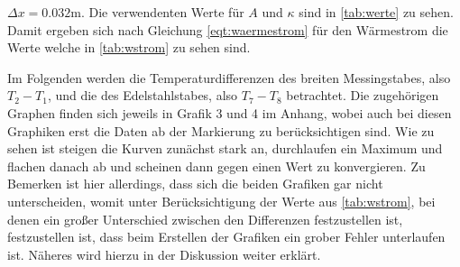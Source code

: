 $\Delta x = 0.032$m. 
Die verwendenten Werte für $A$ und $\kappa$ sind in \autoref{tab:werte} zu sehen.
Damit ergeben sich nach Gleichung \eqref{eqt:waermestrom} für den Wärmestrom die Werte welche in \autoref{tab:wstrom} zu sehen sind.



Im Folgenden werden die Temperaturdifferenzen des breiten Messingstabes, also $T_2-T_1$, und die des Edelstahlstabes, also $T_7 - T_8$ betrachtet. Die 
zugehörigen Graphen finden sich jeweils in Grafik 3 und 4 im Anhang, wobei auch bei diesen Graphiken erst die Daten ab der Markierung zu berücksichtigen sind.
Wie zu sehen ist steigen die Kurven zunächst stark an, durchlaufen ein Maximum und flachen danach ab und scheinen dann gegen einen Wert zu konvergieren.
Zu Bemerken ist hier allerdings, dass sich die beiden Grafiken gar nicht unterscheiden, womit unter Berücksichtigung der Werte aus \autoref{tab:wstrom}, bei denen 
ein großer Unterschied zwischen den Differenzen festzustellen ist, festzustellen ist, dass beim Erstellen der Grafiken ein grober Fehler unterlaufen ist.
Näheres wird hierzu in der Diskussion weiter erklärt.

